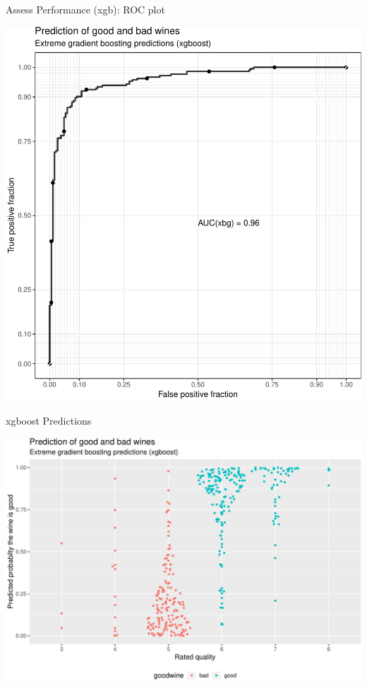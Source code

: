 \documentclass[ignorenonframetext,]{beamer}
\begin{document}
\begin{frame}{Assess Performance (xgb): ROC plot}

\includegraphics[width=0.9\linewidth]{ML_with_caret_files/figure-beamer/assess_ROC-1}

\end{frame}

\begin{frame}{xgboost Predictions}

\includegraphics[width=0.9\linewidth]{ML_with_caret_files/figure-beamer/xgb-pred-plot-1}

\end{frame}
\end{document}
